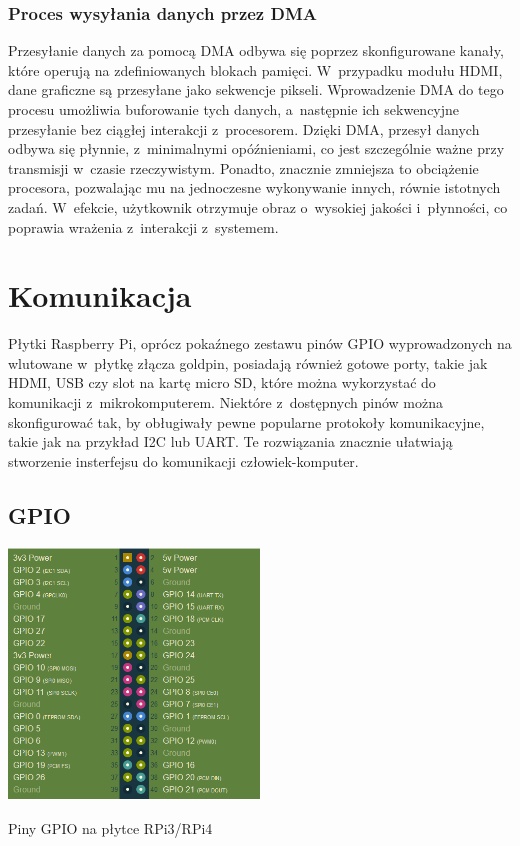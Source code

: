 \documentclass[shortabstract]{iithesis}
\begin{document}
\subsection{Proces wysyłania danych przez DMA}
Przesyłanie danych za pomocą DMA odbywa się poprzez skonfigurowane kanały, które operują na zdefiniowanych blokach pamięci. W~przypadku modułu HDMI, dane graficzne są przesyłane jako sekwencje pikseli. Wprowadzenie DMA do tego procesu umożliwia buforowanie tych danych, a~następnie ich sekwencyjne przesyłanie bez ciągłej interakcji z~procesorem. Dzięki DMA, przesył danych odbywa się płynnie, z~minimalnymi opóźnieniami, co jest szczególnie ważne przy transmisji w~czasie rzeczywistym. Ponadto, znacznie zmniejsza to obciążenie procesora, pozwalając mu na jednoczesne wykonywanie innych, równie istotnych zadań. W~efekcie, użytkownik otrzymuje obraz o~wysokiej jakości i~płynności, co poprawia wrażenia z~interakcji z~systemem.


\chapter{Komunikacja}
Płytki Raspberry Pi, oprócz pokaźnego zestawu pinów GPIO wyprowadzonych na wlutowane w~płytkę złącza goldpin, posiadają również gotowe porty, takie jak HDMI, USB czy slot na kartę micro SD, które można wykorzystać do komunikacji z~mikrokomputerem. Niektóre z~dostępnych pinów można skonfigurować tak, by obługiwały pewne popularne protokoły komunikacyjne, takie jak na przykład I2C lub UART. Te rozwiązania znacznie ułatwiają stworzenie insterfejsu do komunikacji człowiek-komputer.

\section{GPIO}
\begingroup
\centering
\includegraphics[width=0.5\textwidth]{gpio.png}
\captionsetup{type=figure}
\caption{Piny GPIO na płytce RPi3/RPi4}
\endgroup
\end{document}
